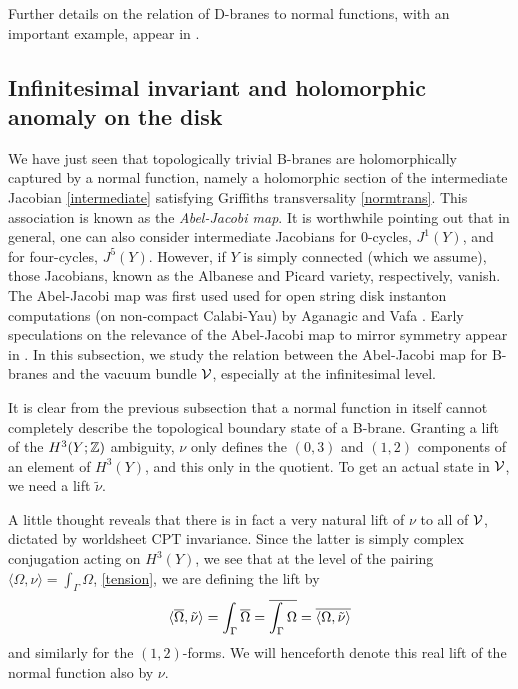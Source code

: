 Further details on the relation of D-branes to normal functions, 
with an important example, appear in \cite{mowa}.


\subsection{Infinitesimal invariant and holomorphic anomaly on the disk}
\label{infinvhan}

We have just seen that topologically trivial B-branes are holomorphically
captured by a normal function, namely a holomorphic section of the intermediate
Jacobian \eqref{intermediate} satisfying Griffiths transversality 
\eqref{normtrans}. This association is known as the {\it Abel-Jacobi map}. 
It is worthwhile pointing out that in general, one can also consider 
intermediate Jacobians for 0-cycles, $J^1(Y)$, and for four-cycles,
$J^5(Y)$. However, if $Y$ is simply connected (which we assume), 
those Jacobians, known as the Albanese and Picard variety, respectively, 
vanish. The Abel-Jacobi map was first used used for open string disk 
instanton computations (on non-compact Calabi-Yau) by Aganagic and 
Vafa \cite{agva}. Early speculations on the relevance of the Abel-Jacobi 
map to mirror symmetry appear in \cite{doma}. In this subsection, we 
study the relation between the Abel-Jacobi map for B-branes and the 
vacuum bundle ${\cal V}$, especially at the infinitesimal level. 

It is clear from the previous subsection that a normal function in 
itself cannot completely describe the topological boundary state of 
a B-brane. Granting a lift of the $H^3(Y;{\mathbb Z})$ ambiguity, $\nu$ 
only defines the $(0,3)$ and $(1,2)$ components of an element of 
$H^3(Y)$, and this only in the quotient. To get an actual state in 
${\cal V}$, we need a lift $\tilde\nu$.

A little thought reveals that there is in fact a very natural lift
of $\nu$ to all of ${\cal V}$, dictated by worldsheet CPT invariance.
Since the latter is simply complex conjugation acting on $H^3(Y)$, we 
see that at the level of the pairing $\langle\Omega,\nu\rangle=
\int_\Gamma\Omega$, \eqref{tension}, we are defining the lift by
\begin{equation}
\eqlabel{reallift}
\langle\Omegab,\tilde\nu\rangle = \int_\Gamma\Omegab 
= \overline{\int_\Gamma\Omega} = \overline{\langle\Omega,\tilde\nu\rangle}
\end{equation}
and similarly for the $(1,2)$-forms. We will henceforth denote this
real lift of the normal function also by $\nu$.

